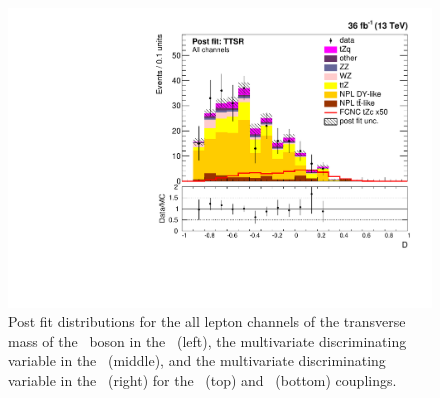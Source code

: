 \begin{figure}[htbp]
	\includegraphics[width=0.49\linewidth]{6_Search/Figures/ZctFit/shapes_fit_s_4_all_error_trial.pdf}
	\caption{Post fit distributions for the all lepton channels of the transverse mass of the \PW\ boson in the \WZCR\ (left), the multivariate discriminating variable in the \STSR\ (middle), and the multivariate discriminating variable in the \TTSR\ (right) for the \Zut\ (top) and \Zct\ (bottom) couplings. }
	\label{fig:shapesfitALL}
\end{figure}



